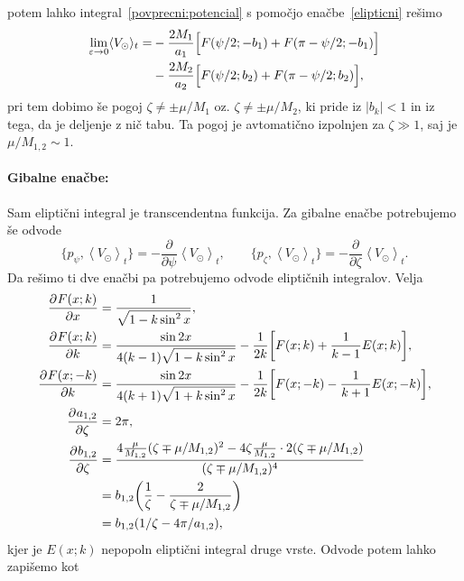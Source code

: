 \documentclass[12pt, a4paper]{article}
\newcommand{\der}[3][]{
    \ensuremath{ \frac{\partial^{#1} #2}{\partial #3^{#1}} }
}
\newcommand{\avgt}[1]{
	\ensuremath{\left\langle #1 \right\rangle_t}
}
\begin{document}
potem lahko integral~\eqref{povprecni:potencial} s pomo\v cjo ena\v cbe~\eqref{elipticni} re\v simo
\begin{align}
	\lim_{\varepsilon \to 0} \langle V_\odot \rangle_t = &- \frac{2M_1}{a_1}\Big[F(\psi/2; -b_1) +
			F(\pi - \psi/2; -b_1)\Big] \notag \\
		&- \frac{2M_2}{a_2}\Big[F(\psi/2; b_2) + F(\pi - \psi/2; b_2)\Big],
	\label{naivno}
\end{align}
pri tem dobimo \v se pogoj $\zeta \neq \pm \mu/M_1$ oz. $\zeta \neq \pm \mu/M_2$, ki pride iz $|b_k| < 1$ in
iz tega, da je deljenje z ni\v c tabu. Ta pogoj je avtomati\v cno izpolnjen za $\zeta \gg 1$, saj je
$\mu/M_{1,2} \sim 1$.

\paragraph{Gibalne ena\v cbe:}
Sam elipti\v cni integral je transcendentna funkcija. Za gibalne ena\v cbe potrebujemo \v se odvode
\begin{equation}
	\{p_\psi, \avgt{V_\odot}\} = -\der{}{\psi}\avgt{V_\odot}, \qquad 
	\{p_\zeta, \avgt{V_\odot}\} = -\der{}{\zeta}\avgt{V_\odot}.
\end{equation}
Da re\v simo ti dve ena\v cbi pa potrebujemo odvode elipti\v cnih integralov. Velja
\begin{align}
	\der{F(x;k)}{x} &= \frac{1}{\sqrt{1 - k\sin^2x}}, \\
	\der{F(x;k)}{k} &= \frac{\sin 2x}{4(k - 1)\sqrt{1 - k\sin^2x}} - \frac{1}{2k}\bigg[F(x;k)
		+ \frac{1}{k-1}E(x;k)\bigg], \\
		\der{F(x;-k)}{k} &= \frac{\sin 2x}{4(k+ 1)\sqrt{1 + k\sin^2x}} - \frac{1}{2k}\bigg[F(x;-k)
		- \frac{1}{{k+1}}E(x;-k)\bigg], \\
	\der{a_{1,2}}{\zeta} &= 2\pi, \\
	\der{b_{1,2}}{\zeta} &= \frac{4\frac{\mu}{M_{1,2}}(\zeta \mp \mu/M_{1,2})^2 - 4\zeta\frac{\mu}{M_{1,2}} \cdot
	2(\zeta \mp \mu/M_{1,2})}{(\zeta \mp \mu/M_{1,2})^4} \notag \\
	&= b_{1,2}\bigg(\frac{1}{\zeta} - \frac{2}{\zeta \mp \mu/M_{1,2}}\bigg) \notag \\
	&= b_{1,2}(1/\zeta - 4\pi/a_{1,2}),
\end{align}
kjer je $E(x;k)$ nepopoln elipti\v cni integral druge vrste. Odvode potem lahko zapi\v semo kot
\end{document}
